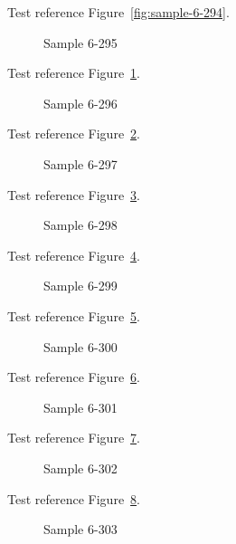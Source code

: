 Test reference Figure~\ref{fig:sample-6-294}.

\begin{figure}[tbhp]
\caption{Sample 6-295}
\label{fig:sample-6-295}
\end{figure}

Test reference Figure~\ref{fig:sample-6-295}.

\begin{figure}[tbhp]
\caption{Sample 6-296}
\label{fig:sample-6-296}
\end{figure}

Test reference Figure~\ref{fig:sample-6-296}.

\begin{figure}[tbhp]
\caption{Sample 6-297}
\label{fig:sample-6-297}
\end{figure}

Test reference Figure~\ref{fig:sample-6-297}.

\begin{figure}[tbhp]
\caption{Sample 6-298}
\label{fig:sample-6-298}
\end{figure}

Test reference Figure~\ref{fig:sample-6-298}.

\begin{figure}[tbhp]
\caption{Sample 6-299}
\label{fig:sample-6-299}
\end{figure}

Test reference Figure~\ref{fig:sample-6-299}.

\begin{figure}[tbhp]
\caption{Sample 6-300}
\label{fig:sample-6-300}
\end{figure}

Test reference Figure~\ref{fig:sample-6-300}.

\begin{figure}[tbhp]
\caption{Sample 6-301}
\label{fig:sample-6-301}
\end{figure}

Test reference Figure~\ref{fig:sample-6-301}.

\begin{figure}[tbhp]
\caption{Sample 6-302}
\label{fig:sample-6-302}
\end{figure}

Test reference Figure~\ref{fig:sample-6-302}.

\begin{figure}[tbhp]
\caption{Sample 6-303}
\label{fig:sample-6-303}
\end{figure}

